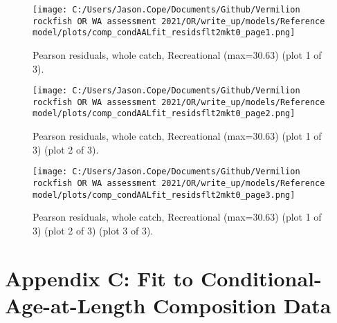 \documentclass[11pt,
  english,
  a4paper,
]{article}
\begin{document}
\tagmcend\tagstructend


\begin{figure}
\centering
\texttt{[image: C:/Users/Jason.Cope/Documents/Github/Vermilion rockfish OR WA assessment 2021/OR/write\_up/models/Reference model/plots/comp\_condAALfit\_residsflt2mkt0\_page1.png]}
\caption{Pearson residuals, whole catch, Recreational (max=30.63) (plot 1 of 3).\label{fig:comp_condAALfit_residsflt2mkt0_page1}}
\end{figure}

\tagmcend\tagstructend


\begin{figure}
\centering
\texttt{[image: C:/Users/Jason.Cope/Documents/Github/Vermilion rockfish OR WA assessment 2021/OR/write\_up/models/Reference model/plots/comp\_condAALfit\_residsflt2mkt0\_page2.png]}
\caption{Pearson residuals, whole catch, Recreational (max=30.63) (plot 1 of 3) (plot 2 of 3).\label{fig:comp_condAALfit_residsflt2mkt0_page2}}
\end{figure}

\tagmcend\tagstructend


\begin{figure}
\centering
\texttt{[image: C:/Users/Jason.Cope/Documents/Github/Vermilion rockfish OR WA assessment 2021/OR/write\_up/models/Reference model/plots/comp\_condAALfit\_residsflt2mkt0\_page3.png]}
\caption{Pearson residuals, whole catch, Recreational (max=30.63) (plot 1 of 3) (plot 2 of 3) (plot 3 of 3).\label{fig:comp_condAALfit_residsflt2mkt0_page3}}
\end{figure}

\tagmcend\tagstructend

\clearpage


\hypertarget{app-c}{%
\section{Appendix C: Fit to Conditional-Age-at-Length Composition Data}\label{app-c}}
\end{document}
